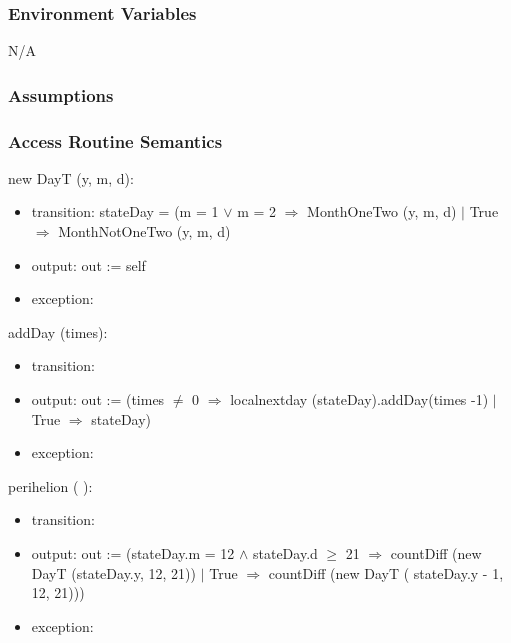 \documentclass[12pt, titlepage]{article}
\begin{document}
\subsubsection{Environment Variables}

N/A\\

\subsubsection{Assumptions}


\subsubsection{ Access Routine Semantics}

\noindent  new DayT (y, m, d):
\begin{itemize}
\item transition:  stateDay = (m = 1 $\lor$ m = 2 $\Rightarrow$ MonthOneTwo (y, m, d) $|$ True $\Rightarrow$ MonthNotOneTwo (y, m, d)\\

\item output: out := self
\item exception: 
\end{itemize}

\noindent  addDay (times):
\begin{itemize}
\item transition: 
\item output: out := (times $\ne$ 0 $\Rightarrow$ localnextday (stateDay).addDay(times -1) $|$ True $\Rightarrow$ stateDay)

\item exception:
\end{itemize}

\noindent  perihelion ( ):
\begin{itemize}
\item transition: 
\item output: out := (stateDay.m = 12 $	\wedge$ stateDay.d $\geq	$ 21 $\Rightarrow$  countDiff (new DayT (stateDay.y, 12, 21)) $|$ True $\Rightarrow$ countDiff (new DayT ( stateDay.y - 1, 12, 21)))
\item exception:
\end{itemize}
\end{document}
